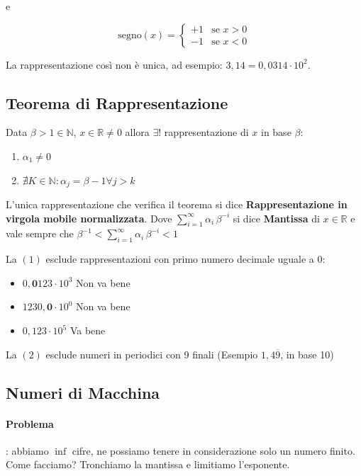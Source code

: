 \documentclass[a4paper,12pt]{article}
\begin{document}
	e
	
	\[
	\mathrm{segno}(x) =
	\begin{cases}
		+1 & \text{se } x > 0 \\
		-1 & \text{se } x < 0
	\end{cases}
	\]
	
	\begin{tcolorbox}[title=Attenzione, colback=white]
		La rappresentazione così non è unica, ad esempio: $3{,}14 = 0{,}0314 \cdot 10^{2}$.
	\end{tcolorbox}
	
	\subsection{Teorema di Rappresentazione}
	Data $\beta > 1 \in \mathbb{N}$, $x \in \mathbb{R} \neq 0$ allora $\exists!$ rappresentazione di $x$ in base $\beta :$
	
	\begin{enumerate}
		\item $\alpha_1 \neq 0$
		\item $\nexists K \in \mathbb{N} : \alpha_j = \beta-1 \forall j>k$
	\end{enumerate}
	
	L'unica rappresentazione che verifica il teorema si dice \textbf{Rappresentazione in virgola mobile normalizzata}.
	Dove $\sum_{i=1}^{\infty} \alpha_i \, \beta^{-i}$ si dice \textbf{Mantissa} di $x \in \mathbb{R}$ e vale sempre che $ \beta^{-1} < \sum_{i=1}^{\infty} \alpha_i \, \beta^{-i} < 1$
	
	\begin{tcolorbox}[title=Esempio]
		La $(1)$ esclude rappresentazioni con primo numero decimale uguale a 0:
		\begin{itemize}
			\item $0,\mathbf{0}123 \cdot 10^{3}$ Non va bene
			\item $1230,\mathbf{0} \cdot 10^{0}$ Non va bene
			\item $0,123 \cdot 10^{5}$ Va bene
		\end{itemize}
		La $(2)$ esclude numeri in periodici con 9 finali (Esempio $1,4\overline{9}$, in base 10)
 	\end{tcolorbox}
 	
 	\subsection{Numeri di Macchina}
 	
 	\paragraph{Problema}: abbiamo $\inf$ cifre, ne possiamo tenere in considerazione solo un numero finito. Come facciamo? Tronchiamo la mantissa e limitiamo l'esponente.
 	
\end{document}

